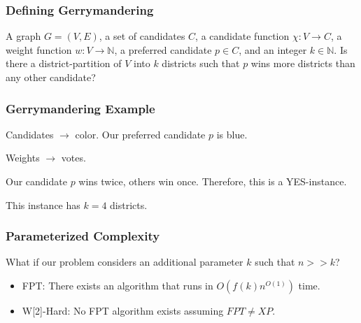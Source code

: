 
\begin{frame}[t]
	\frametitle{Defining Gerrymandering}
	\small
	{A graph $G = (V,E)$, a set of candidates $C$, a candidate function $\chi: V \rightarrow C$, a weight function $w: V \rightarrow \mathbb{N}$, a preferred candidate $p \in C$, and an integer $k \in \mathbb{N}$.}
	{Is there a district-partition of $V$ into $k$ districts such that $p$ wins more districts than any other candidate?}

	\begin{figure}
		\begin{center}
			
		\end{center}
	\end{figure}
\end{frame}

\begin{frame}[t]
	\frametitle{Gerrymandering Example}
	\begin{figure}
		\begin{center}
			
		\end{center}
	\end{figure}

	\begin{itemize}
		\item Candidates $\rightarrow$ color. Our preferred candidate $p$ is blue.
		\item Weights $\rightarrow$ votes.
		\onslide<3> {
			\item Our candidate $p$ wins twice, others win once. Therefore, this is a YES-instance.
			\item This instance has $k=4$ districts.
		}
	\end{itemize}
\end{frame}

\begin{frame}[t]
	\frametitle{Parameterized Complexity}
	What if our problem considers an additional parameter $k$ such that $n >> k$?
	\vspace{1.0cm}
	\begin{itemize}
		\item FPT: There exists an algorithm that runs in $O(f(k)n^{O(1)})$ time.
		\vspace{1.0cm}
		\item W[2]-Hard: No FPT algorithm exists assuming $FPT \neq XP$.
	\end{itemize}
\end{frame}